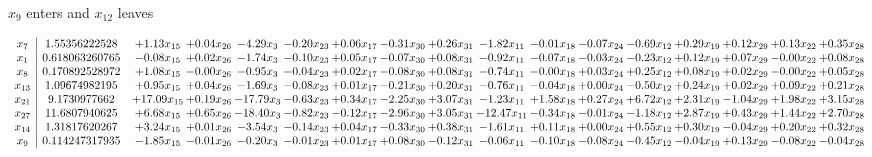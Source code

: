 \documentclass[9pt]{article}
\begin{document}
 $ x_{9} $ enters and $ x_{12} $ leaves 

 \[\begin{array}{c| c c@{\hskip 2pt} c@{\hskip 2pt} c@{\hskip 2pt} c@{\hskip 2pt} c@{\hskip 2pt} c@{\hskip 2pt} c@{\hskip 2pt} c@{\hskip 2pt} c@{\hskip 2pt} c@{\hskip 2pt} c@{\hskip 2pt} c@{\hskip 2pt} c@{\hskip 2pt} c@{\hskip 2pt} c@{\hskip 2pt} }
 x_{7}   &  1.55356222528 & +  1.13 x_{15} & +  0.04 x_{26} & -4.29 x_{3} & -0.20 x_{23} & +  0.06 x_{17} & -0.31 x_{30} & +  0.26 x_{31} & -1.82 x_{11} & -0.01 x_{18} & -0.07 x_{24} & -0.69 x_{12} & +  0.29 x_{19} & +  0.12 x_{29} & +  0.13 x_{22} & +  0.35 x_{28}\\
 x_{1}   &  0.618063260765 & -0.08 x_{15} & +  0.02 x_{26} & -1.74 x_{3} & -0.10 x_{23} & +  0.05 x_{17} & -0.07 x_{30} & +  0.08 x_{31} & -0.92 x_{11} & -0.07 x_{18} & -0.03 x_{24} & -0.23 x_{12} & +  0.12 x_{19} & +  0.07 x_{29} & -0.00 x_{22} & +  0.08 x_{28}\\
 x_{8}   &  0.170892528972 & +  1.08 x_{15} & -0.00 x_{26} & -0.95 x_{3} & -0.04 x_{23} & +  0.02 x_{17} & -0.08 x_{30} & +  0.08 x_{31} & -0.74 x_{11} & -0.00 x_{18} & +  0.03 x_{24} & +  0.25 x_{12} & +  0.08 x_{19} & +  0.02 x_{29} & -0.00 x_{22} & +  0.05 x_{28}\\
 x_{13}   &  1.09674982195 & +  0.95 x_{15} & +  0.04 x_{26} & -1.69 x_{3} & -0.08 x_{23} & +  0.01 x_{17} & -0.21 x_{30} & +  0.20 x_{31} & -0.76 x_{11} & -0.04 x_{18} & +  0.00 x_{24} & -0.50 x_{12} & +  0.24 x_{19} & +  0.02 x_{29} & +  0.09 x_{22} & +  0.21 x_{28}\\
 x_{21}   &  9.1730977662 & + 17.09 x_{15} & +  0.19 x_{26} & -17.79 x_{3} & -0.63 x_{23} & +  0.34 x_{17} & -2.25 x_{30} & +  3.07 x_{31} & -1.23 x_{11} & +  1.58 x_{18} & +  0.27 x_{24} & +  6.72 x_{12} & +  2.31 x_{19} & -1.04 x_{29} & +  1.98 x_{22} & +  3.15 x_{28}\\
 x_{27}   &  11.6807940625 & +  6.68 x_{15} & +  0.65 x_{26} & -18.40 x_{3} & -0.82 x_{23} & -0.12 x_{17} & -2.96 x_{30} & +  3.05 x_{31} & -12.47 x_{11} & -0.34 x_{18} & -0.01 x_{24} & -1.18 x_{12} & +  2.87 x_{19} & +  0.43 x_{29} & +  1.44 x_{22} & +  2.70 x_{28}\\
 x_{14}   &  1.31817620267 & +  3.24 x_{15} & +  0.01 x_{26} & -3.54 x_{3} & -0.14 x_{23} & +  0.04 x_{17} & -0.33 x_{30} & +  0.38 x_{31} & -1.61 x_{11} & +  0.11 x_{18} & +  0.00 x_{24} & +  0.55 x_{12} & +  0.30 x_{19} & -0.04 x_{29} & +  0.20 x_{22} & +  0.32 x_{28}\\
 x_{9}   &  0.114247317935 & -1.85 x_{15} & -0.01 x_{26} & -0.20 x_{3} & -0.01 x_{23} & +  0.01 x_{17} & +  0.08 x_{30} & -0.12 x_{31} & -0.06 x_{11} & -0.10 x_{18} & -0.08 x_{24} & -0.45 x_{12} & -0.04 x_{19} & +  0.13 x_{29} & -0.08 x_{22} & -0.04 x_{28}\\

\end{array}\]
\end{document}
